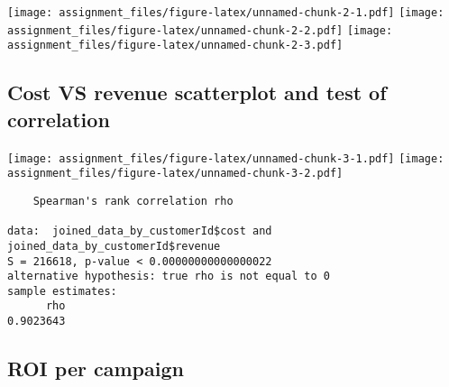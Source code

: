 \documentclass[
]{article}
\begin{document}
\texttt{[image: assignment\_files/figure-latex/unnamed-chunk-2-1.pdf]}
\texttt{[image: assignment\_files/figure-latex/unnamed-chunk-2-2.pdf]}
\texttt{[image: assignment\_files/figure-latex/unnamed-chunk-2-3.pdf]}

\hypertarget{cost-vs-revenue-scatterplot-and-test-of-correlation}{%
\subsection{Cost VS revenue scatterplot and test of
correlation}\label{cost-vs-revenue-scatterplot-and-test-of-correlation}}

\texttt{[image: assignment\_files/figure-latex/unnamed-chunk-3-1.pdf]}
\texttt{[image: assignment\_files/figure-latex/unnamed-chunk-3-2.pdf]}

\begin{verbatim}
    Spearman's rank correlation rho

data:  joined_data_by_customerId$cost and joined_data_by_customerId$revenue
S = 216618, p-value < 0.00000000000000022
alternative hypothesis: true rho is not equal to 0
sample estimates:
      rho 
0.9023643 
\end{verbatim}

\hypertarget{roi-per-campaign}{%
\subsection{ROI per campaign}\label{roi-per-campaign}}
\end{document}
